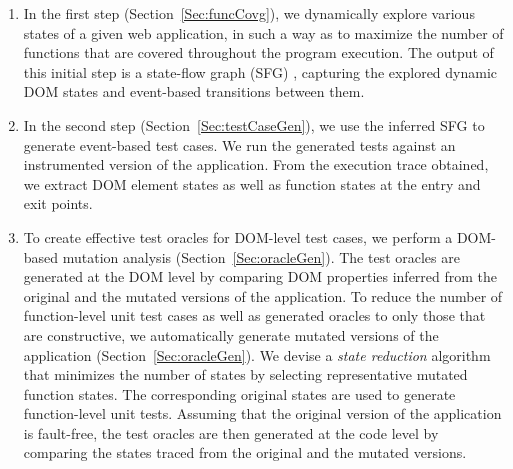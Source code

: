 \begin{enumerate}%
 
\item In the first step (Section~\ref{Sec:funcCovg}), we dynamically explore various states of a given web 
application, in such a way as to maximize the number of functions that are covered throughout the program execution. The output of this initial step is a state-flow graph (SFG) \cite{mesbah:tse12}, capturing the explored dynamic DOM states and event-based transitions between them. 

\item In the second step (Section~\ref{Sec:testCaseGen}), we use the inferred SFG to generate event-based test cases.
We run the generated tests against an instrumented version of the application. From the execution trace obtained, we extract DOM element states as well as \javascript function states at the entry and exit points.%

\item To create effective test oracles for DOM-level test cases, we perform a DOM-based mutation analysis (Section~\ref{Sec:oracleGen}).
The test oracles are generated at the DOM level by comparing DOM properties inferred from the original and the mutated versions of the application.
To reduce the number of function-level unit test cases as well as generated oracles to only those that are constructive, 
we automatically generate mutated versions of the application (Section~\ref{Sec:oracleGen}). We devise a \emph{state reduction} algorithm that minimizes the number of states by selecting representative mutated function states. The corresponding original states are used to generate function-level unit tests.
Assuming that the original version of the application is fault-free, the test oracles are then generated at the code level by comparing the states traced from the original and the mutated versions.

\end{enumerate}




  

   